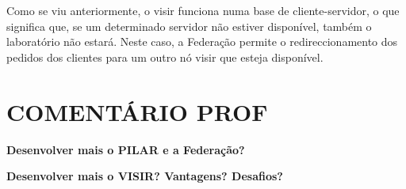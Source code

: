Como se viu anteriormente, o \acrshort{visir} funciona numa base de cliente-servidor, o que significa que, se um determinado servidor não estiver disponível, também o laboratório não estará. Neste caso, a Federação permite o redireccionamento dos pedidos dos clientes para um outro nó \acrshort{visir} que esteja disponível\cite{kreiter}.

\section{COMENTÁRIO PROF}
\textbf{ Desenvolver mais o PILAR e a Federação?}

\textbf{Desenvolver mais o VISIR? Vantagens? Desafios?}